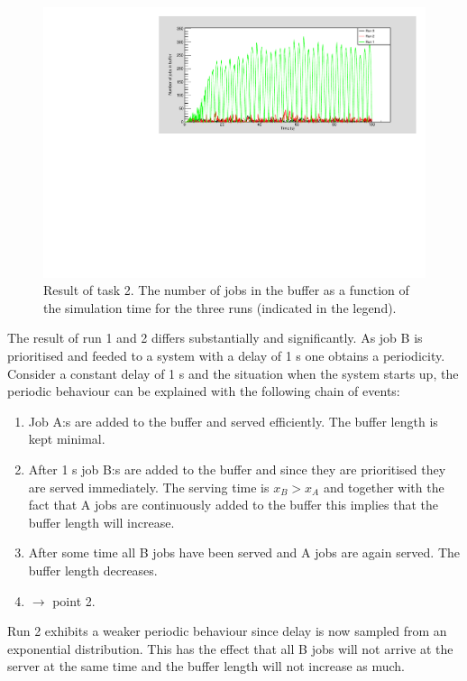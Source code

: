 \documentclass[]{article}
\begin{document}
\begin{figure}[H]
  \centering
  \includegraphics[width=\textwidth]{task2.pdf}
  \caption{Result of task 2. The number of jobs in the buffer as a function of the simulation time for the three runs (indicated in the legend).}
  \label{fig:task2}
\end{figure}

The result of run 1 and 2 differs substantially and significantly.
As job B is prioritised and feeded to a system with a delay of 1 s one obtains a periodicity.
Consider a constant delay of 1 s and the situation when the system starts up, the periodic behaviour can be explained with the following chain of events:
\begin{enumerate}
  \item Job A:s are added to the buffer and served efficiently. The buffer length is kept minimal.
  \item After 1 s job B:s are added to the buffer and since they are prioritised they are served immediately. The serving time is $ x_B > x_A $ and together with the fact that A jobs are continuously added to the buffer this implies that the buffer length will increase.
  \item After some time all B jobs have been served and A jobs are again served. The buffer length decreases.
  \item $\rightarrow$ point 2.
\end{enumerate}
Run 2 exhibits a weaker periodic behaviour since delay is now sampled from an exponential distribution.
This has the effect that all B jobs will not arrive at the server at the same time and the buffer length will not increase as much.
\end{document}
